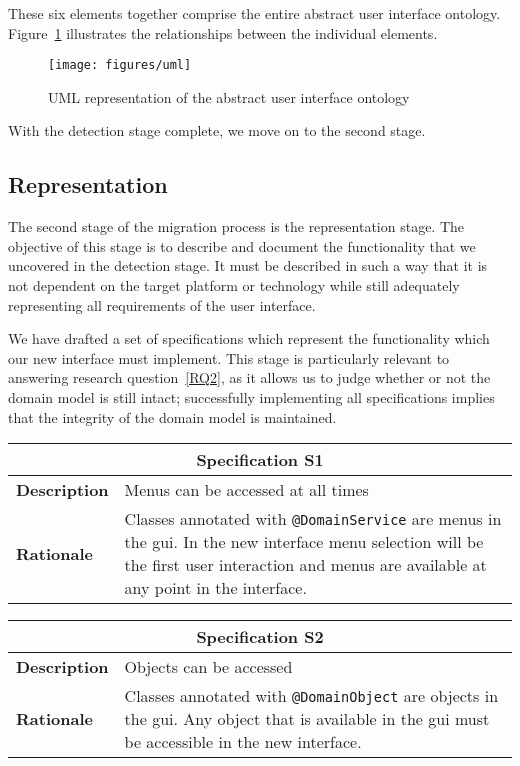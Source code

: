 These six elements together comprise the entire abstract user interface ontology. Figure~\ref{figure:uml} illustrates the relationships between the individual elements.

\begin{figure}
	\center
	\texttt{[image: figures/uml]}
	\caption{UML representation of the abstract user interface ontology}
	\label{figure:uml}
\end{figure}

With the detection stage complete, we move on to the second stage.

\subsection{Representation}
\label{subsection:representation}
The second stage of the migration process is the representation stage. The objective of this stage is to describe and document the functionality that we uncovered in the detection stage. It must be described in such a way that it is not dependent on the target platform or technology while still adequately representing all requirements of the user interface.

We have drafted a set of specifications which represent the functionality which our new interface must implement. This stage is particularly relevant to answering research question~\ref{RQ2}, as it allows us to judge whether or not the domain model is still intact; successfully implementing all specifications implies that the integrity of the domain model is maintained.

\newpage
\noindent
\small

\begin{tabularx}{0.49\textwidth}[t]{lX}
	\toprule
	\multicolumn{2}{c}{\textbf{Specification S1}} \\
	\midrule
	\textbf{Description} & Menus can be accessed at all times \\
	\addlinespace[0.5em]
	\textbf{Rationale}	 & Classes annotated with \texttt{@DomainService} are menus in the \acrshort{gui}. In the new interface menu selection will be the first user interaction and menus are available at any point in the interface. \\
	\bottomrule
\end{tabularx}\hspace{0.02\textwidth}
\begin{tabularx}{0.49\textwidth}[t]{lX}
	\toprule
	\multicolumn{2}{c}{\textbf{Specification S2}} \\
	\midrule
	\textbf{Description} & Objects can be accessed \newline \\
	\addlinespace[0.5em]
	\textbf{Rationale}	 & Classes annotated with \texttt{@DomainObject} are objects in the \acrshort{gui}. Any object that is available in the \acrshort{gui} must be accessible in the new interface. \newline \\
	\bottomrule
\end{tabularx}
\\[1em]

